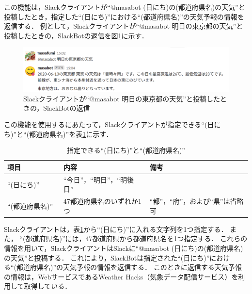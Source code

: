 \documentclass[12pt]{jsarticle}
\begin{document}
\begin{description}
  この機能は，Slackクライアントが``@masabot (日にち)の(都道府県名)の天気''と投稿したとき，指定した``(日にち)''における``(都道府県名)''の天気予報の情報を返信する．
  例として，Slackクライアントが``@masabot 明日の東京都の天気''と投稿したときの，SlackBotの返信を図\ref{fig:weather}に示す．
  \begin{figure}[t]
    \centering
    \includegraphics[width=1\textwidth]{figs/slackbot_weather2.png}
    \caption{Slackクライアントが``@masabot 明日の東京都の天気''と投稿したときの，SlackBotの返信}
    \label{fig:weather}
  \end{figure}
  この機能を使用するにあたって，Slackクライアントが指定できる``(日にち)''と``(都道府県名)''を表\ref{tab:3}に示す．
  \begin{table}[t]
  \begin{center}
    \caption{指定できる``(日にち)''と``(都道府県名)''}\label{tab:3}
    \begin{tabular}{l|l|l}
      \hline\hline
      \multicolumn{1}{l|}{項目} & \multicolumn{1}{l}{内容} &\multicolumn{1}{|l}{備考}\\
      \hline
      ``(日にち)'' & ``今日''，``明日''，``明後日'' &\\
      ``(都道府県名)''　& 47都道府県名のいずれか1つ & ``都''，``府''，および``県''は省略可\\
      \hline
    \end{tabular}
  \end{center}
  \end{table}
  Slackクライアントは，表\ref{tab:3}から``(日にち)''に入れる文字列を1つ指定する．
  また， ``(都道府県名)''には，47都道府県から都道府県名を1つ指定する．
  これらの情報を用いて，SlackクライアントはSlackに``@masabot (日にち)の(都道府県名)の天気''と投稿する．
  これにより，SlackBotは指定された``(日にち)''における``(都道府県名)''の天気予報の情報を返信する．
  このときに返信する天気予報の情報は，WebサービスであるWeather Hacks（気象データ配信サービス）\cite{Weather_Hacks}を利用して取得している．
\end{description}
\end{document}
